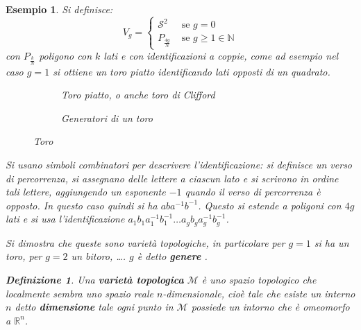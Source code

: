 \documentclass[10pt, twoside=false, x11names]{scrbook}
\newtheorem{definition}[theorem]{Definizione}
\newtheorem{example}[theorem]{Esempio}
\newcommand{\M}{\mathcal{M}}
\newcommand{\RN}[1][]{\mathbb{R}^#1}
\newcommand{\Sph}[1][]{\mathcal{S}^#1}
\begin{document}
\begin{example}
  Si definisce:
  \[
    V_g =
    \begin{cases}
      \Sph{2} & \text{ se } g = 0 \\
      P_{\frac{4g}{N}} & \text{ se } g \geq 1 \in \mathbb{N}
    \end{cases}
  \]
  con $ P_{\frac{k}{N}} $ poligono con $ k $ lati e con identificazioni a coppie, come
  ad esempio nel caso $ g = 1 $ si ottiene un toro piatto identificando lati opposti
  di un quadrato.
  \begin{figure}[htbp]
    \centering
    \begin{subfigure}[htbp]{.45\linewidth}
      \centering{}
      \caption{Toro piatto, o anche toro di Clifford}
      \label{fig:lez3:clifford_torus}
    \end{subfigure}
    \begin{subfigure}[htbp]{.45\linewidth}
      \centering
      \def\svgwidth{0.9\textwidth}
      
      \caption{Generatori di un toro}
      \label{fig:lez3:torus_generators}
    \end{subfigure}
    \label{fig:lez3:torus}
    \caption{Toro}
  \end{figure}
  Si usano simboli combinatori per descrivere l'identificazione: si definisce un verso di percorrenza, si assegnano delle lettere a ciascun
  lato e si scrivono in ordine tali lettere, aggiungendo un esponente $ -1 $ quando il verso di percorrenza è opposto. In questo caso quindi
  si ha $ aba^{-1}b^{-1} $. Questo si estende a poligoni con $ 4g $ lati e si usa l'identificazione
  $ a_1 b_1 a_1^{-1} b_1^{-1} \dots a_g b_g a_g^{-1} b_g^{-1} $.

  Si dimostra che queste sono varietà topologiche, in particolare per $ g = 1 $ si ha un toro, per $ g = 2 $ un bitoro, \dots. $ g $ è
  detto \textbf{genere} .

  \begin{definition}
    Una \textbf{varietà topologica} $ \M $ è uno spazio topologico
    che localmente sembra uno spazio reale $ n $-dimensionale, cioè tale che esiste un
    interno $ n $ detto \textbf{dimensione}
    tale ogni punto in $ \M $ possiede un intorno che è omeomorfo a $ \RN{n} $.
  \end{definition}


\end{example}
\end{document}
